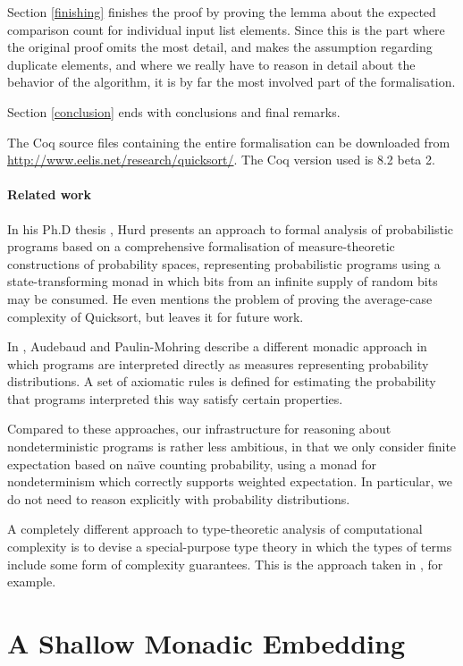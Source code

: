 \documentclass[runningheads]{llncs}
\begin{document}
Section \ref{finishing} finishes the proof by proving the lemma about the expected comparison count for individual input list elements. Since this is the part where the original proof omits the most detail, and makes the assumption regarding duplicate elements, and where we really have to reason in detail about the behavior of the algorithm, it is by far the most involved part of the formalisation.

Section \ref{conclusion} ends with conclusions and final remarks.

The Coq source files containing the entire formalisation can be downloaded from \url{http://www.eelis.net/research/quicksort/}. The Coq version used is 8.2 beta 2.

\paragraph{Related work}

In his Ph.D thesis \cite{hurd}, Hurd presents an approach to formal analysis
of probabilistic programs based on a comprehensive formalisation of
measure-theoretic constructions of probability spaces, representing
probabilistic programs using a state-transforming monad in which bits from an
infinite supply of random bits may be consumed. He even mentions the problem
of proving the average-case complexity of Quicksort, but leaves it for future work.

In \cite{mohringaudebaud}, Audebaud and Paulin-Mohring describe a different monadic approach in which programs are interpreted directly as measures representing probability distributions. A set of axiomatic rules is defined for estimating the probability that programs interpreted this way satisfy certain properties.

Compared to these approaches, our infrastructure for reasoning about nondeterministic programs is rather less ambitious, in that we only consider finite expectation based on na{\"\i}ve counting probability, using a monad for nondeterminism which correctly supports weighted expectation. In particular, we do not need to reason explicitly with probability distributions.

A completely different approach to type-theoretic analysis of computational complexity is to devise a special-purpose type theory in which the types of terms include some form of complexity guarantees. This is the approach taken in \cite{constable}, for example.

\section{A Shallow Monadic Embedding}
\label{embed}
\end{document}
